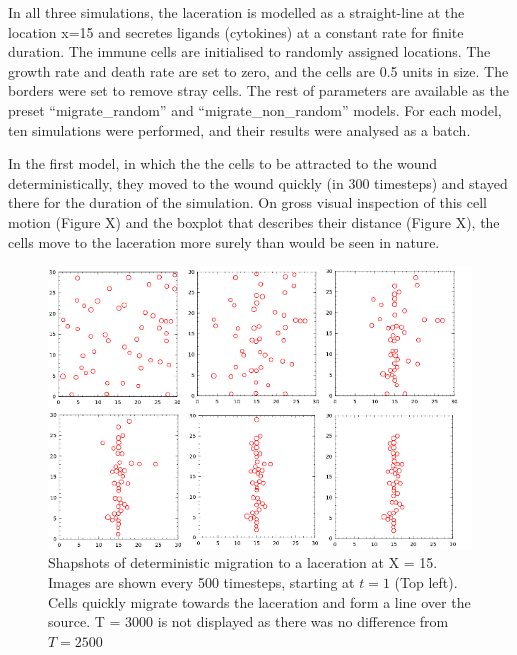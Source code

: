 \documentclass[12pt]{article}
\begin{document}
In all three simulations, the laceration is modelled as a straight-line 
at the location x=15 and secretes ligands (cytokines) at a constant rate 
for finite duration. The immune cells are initialised to randomly assigned 
locations. The growth rate and death rate are set to zero, and the cells 
are 0.5 units in size. The borders were set to remove stray cells. The 
rest of parameters are available as the preset ``migrate\_random'' and 
``migrate\_non\_random'' models. For each model, ten simulations were 
performed, and their results were analysed as a batch.

In the first model, in which the the cells to be attracted to the wound 
deterministically, they moved to the wound quickly (in 300 timesteps) 
and stayed there for the duration of the simulation. On gross visual 
inspection of this cell motion (Figure X) and the boxplot that describes 
their distance (Figure X), the cells move to the laceration more surely 
than would be seen in nature.

\begin{figure}[H]
\centering
\includegraphics[width=14.41cm]{media/Collated_determinstic.png}
\caption{Shapshots of deterministic 
migration to a laceration at X = 15. Images are shown every 500 timesteps, 
starting at \(t = 1\) (Top left). Cells quickly migrate towards the laceration and 
form a line over the source. T = 3000 is not displayed as there was no 
difference from \(T = 2500\)}
\end{figure}
\end{document}
